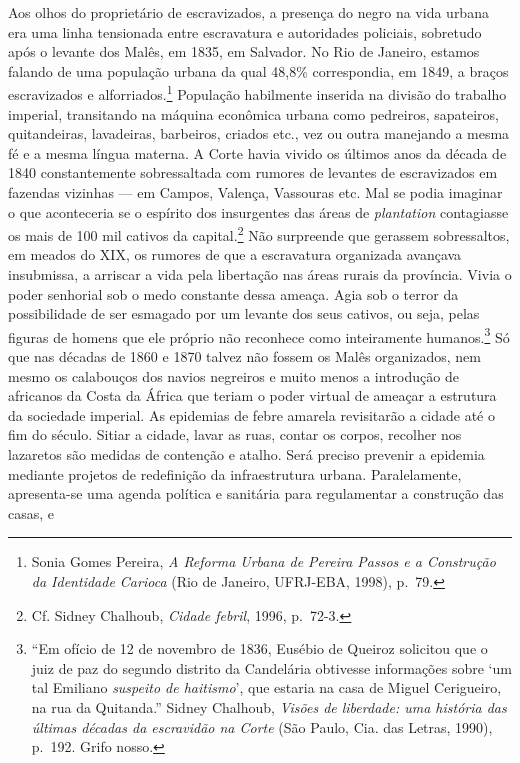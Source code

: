 Aos olhos do proprietário de escravizados, a presença do negro na vida
urbana era uma linha tensionada entre escravatura e autoridades
policiais, sobretudo após o levante dos Malês, em 1835, em Salvador. No
Rio de Janeiro, estamos falando de uma população urbana da qual 48,8\%
correspondia, em 1849, a braços escravizados e alforriados.\footnote{Sonia
  Gomes Pereira, \textit{A Reforma Urbana de Pereira Passos e a Construção
  da Identidade Carioca} (Rio de Janeiro, UFRJ-EBA, 1998), p.~79.}
População habilmente inserida na divisão do trabalho imperial,
transitando na máquina econômica urbana como pedreiros, sapateiros,
quitandeiras, lavadeiras, barbeiros, criados etc., vez ou outra
manejando a mesma fé e a mesma língua materna. A Corte havia vivido os
últimos anos da década de 1840 constantemente sobressaltada com rumores
de levantes de escravizados em fazendas vizinhas --- em Campos, Valença,
Vassouras etc. Mal se podia imaginar o que aconteceria se o espírito dos
insurgentes das áreas de \textit{plantation} contagiasse os mais de 100
mil cativos da capital.\footnote{Cf. Sidney Chalhoub, \textit{Cidade
  febril}, 1996, p.~72-3.} Não surpreende que gerassem sobressaltos, em
meados do XIX, os rumores de que a escravatura organizada avançava
insubmissa, a arriscar a vida pela libertação nas áreas rurais da
província. Vivia o poder senhorial sob o medo constante dessa ameaça.
Agia sob o terror da possibilidade de ser esmagado por um levante dos
seus cativos, ou seja, pelas figuras de homens que ele próprio não
reconhece como inteiramente humanos.\footnote{``Em ofício de 12 de
  novembro de 1836, Eusébio de Queiroz solicitou que o juiz de paz do
  segundo distrito da Candelária obtivesse informações sobre `um tal
  Emiliano \textit{suspeito de haitismo}', que estaria na casa de Miguel
  Cerigueiro, na rua da Quitanda.'' Sidney Chalhoub, \textit{Visões de
  liberdade: uma história das últimas décadas da escravidão na Corte}
  (São Paulo, Cia. das Letras, 1990), p.~192. Grifo nosso.} Só que nas
décadas de 1860 e 1870 talvez não fossem os Malês organizados, nem mesmo
os calabouços dos navios negreiros e muito menos a introdução de
africanos da Costa da África que teriam o poder virtual de ameaçar a
estrutura da sociedade imperial. As epidemias de febre amarela
revisitarão a cidade até o fim do século. Sitiar a cidade, lavar as
ruas, contar os corpos, recolher nos lazaretos são medidas de contenção
e atalho. Será preciso prevenir a epidemia mediante projetos de
redefinição da infraestrutura urbana. Paralelamente, apresenta-se uma
agenda política e sanitária para regulamentar a construção das casas, e
